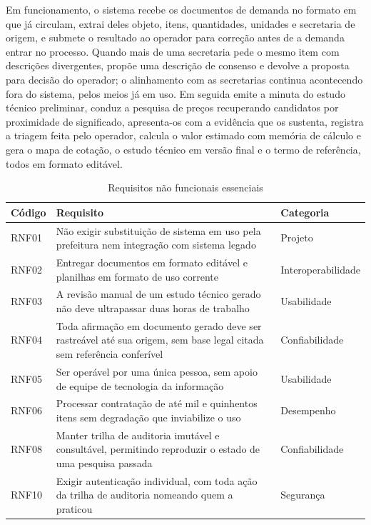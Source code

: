 Em funcionamento, o sistema recebe os documentos de demanda no formato em que já
circulam, extrai deles objeto, itens, quantidades, unidades e secretaria de
origem, e submete o resultado ao operador para correção antes de a demanda entrar
no processo. Quando mais de uma secretaria pede o mesmo item com descrições
divergentes, propõe uma descrição de consenso e devolve a proposta para decisão
do operador; o alinhamento com as secretarias continua acontecendo fora do
sistema, pelos meios já em uso. Em seguida emite a minuta do estudo técnico
preliminar, conduz a pesquisa de preços recuperando candidatos por proximidade de
significado, apresenta-os com a evidência que os sustenta, registra a triagem
feita pelo operador, calcula o valor estimado com memória de cálculo e gera o
mapa de cotação, o estudo técnico em versão final e o termo de referência, todos
em formato editável.

\begin{table}[H]
  \centering
  \caption{Requisitos não funcionais essenciais}
  \label{tab:rnf-essenciais}
  \begin{ufopaespacosimples}
  \small
  \begin{tabularx}{\textwidth}{@{}lXl@{}}
    \toprule
    \textbf{Código} & \textbf{Requisito} & \textbf{Categoria} \\
    \midrule
    RNF01 & Não exigir substituição de sistema em uso pela prefeitura nem
      integração com sistema legado & Projeto \\
    RNF02 & Entregar documentos em formato editável e planilhas em formato de
      uso corrente & Interoperabilidade \\
    RNF03 & A revisão manual de um estudo técnico gerado não deve ultrapassar
      duas horas de trabalho & Usabilidade \\
    RNF04 & Toda afirmação em documento gerado deve ser rastreável até sua
      origem, sem base legal citada sem referência conferível & Confiabilidade \\
    RNF05 & Ser operável por uma única pessoa, sem apoio de equipe de tecnologia
      da informação & Usabilidade \\
    RNF06 & Processar contratação de até mil e quinhentos itens sem degradação
      que inviabilize o uso & Desempenho \\
    RNF08 & Manter trilha de auditoria imutável e consultável, permitindo
      reproduzir o estado de uma pesquisa passada & Confiabilidade \\
    RNF10 & Exigir autenticação individual, com toda ação da trilha de auditoria
      nomeando quem a praticou & Segurança \\
    \bottomrule
  \end{tabularx}
  \end{ufopaespacosimples}
\end{table}


